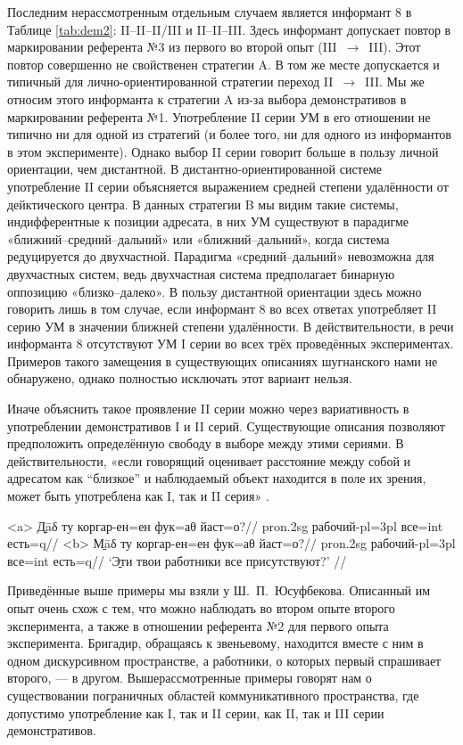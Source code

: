 Последним нерассмотренным отдельным случаем является информант 8 в Таблице \ref{tab:dem2}: II–II–II/III и II–II–III. Здесь информант допускает повтор в маркировании референта №3 из первого во второй опыт (III~$\rightarrow$~III). Этот повтор совершенно не свойственен стратегии A. В том же месте допускается и типичный для лично-ориентированной стратегии переход II~$\rightarrow$~III. Мы же относим этого информанта к стратегии A из-за выбора демонстративов в маркировании референта №1. Употребление II серии УМ в его отношении не типично ни для одной из стратегий (и более того, ни для одного из информантов в этом эксперименте). Однако выбор II серии говорит больше в пользу личной ориентации, чем дистантной. В дистантно-ориентированной системе употребление II серии объясняется выражением средней степени удалённости от дейктического центра. В данных стратегии B мы видим такие системы, индифферентные к позиции адресата, в них УМ существуют в парадигме «ближний–средний–дальний» или «ближний–дальний», когда система редуцируется до двухчастной. Парадигма «средний–дальний» невозможна для двухчастных систем, ведь двухчастная система предполагает бинарную оппозицию «близко–далеко». В пользу дистантной ориентации здесь можно говорить лишь в том случае, если информант 8 во всех ответах употребляет II серию УМ в значении ближней степени удалённости. В действительности, в речи информанта 8 отсутствуют УМ I серии во всех трёх проведённых экспериментах. Примеров такого замещения в существующих описаниях шугнанского нами не обнаружено, однако полностью исключать этот вариант нельзя.

Иначе объяснить такое проявление II серии можно через вариативность в употреблении демонстративов I и II серий. Существующие описания позволяют предположить определённую свободу в выборе между этими сериями. В действительности, «если говорящий оценивает расстояние между собой и адресатом как “близкое” и наблюдаемый объект находится в поле их зрения, может быть употреблена как I, так и II серия» \parencite[35]{yusufbekov1998}.

\a<a> \begingl
\gla \b{Дāδ} ту коргар-ен=ен фук=аθ йаст=о?//
 {\sc pron.2sg} рабочий-{\sc pl=3pl} все={\sc int} есть={\sc q}//
\endgl
\a<b> \begingl
\gla \b{Мāδ} ту коргар-ен=ен фук=аθ йаст=о?//
 {\sc pron.2sg} рабочий-{\sc pl=3pl} все={\sc int} есть={\sc q}//
\glft ‘\b{Эти} твои работники все присутствуют?’ //
\endgl \xe

Приведённые выше примеры мы взяли у Ш.~П.~Юсуфбекова. Описанный им опыт очень схож с тем, что можно наблюдать во втором опыте второго эксперимента, а также в отношении референта №2 для первого опыта эксперимента. Бригадир, обращаясь к звеньевому, находится вместе с ним в одном дискурсивном пространстве, а работники, о которых первый спрашивает второго, — в другом. Вышерассмотренные примеры говорят нам о существовании пограничных областей коммуникативного пространства, где допустимо употребление как I, так и II серии, как II, так и III серии демонстративов.

